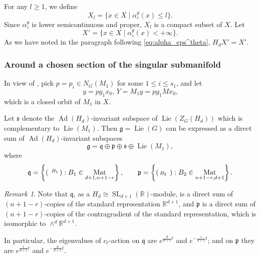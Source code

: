 \documentclass[12pt,reqno]{amsart}
\newcommand{\SL}{\operatorname{SL}}
\numberwithin{equation}{section}
\theoremstyle{plain}
\theoremstyle{definition}
\theoremstyle{remark}
\newtheorem{remark}{Remark}[section]
\newcommand\fg{\mathfrak{g}}
\newcommand\fq{\mathfrak{q}}
\newcommand\fs{\mathfrak{s}}
\newcommand{\R}{\mathbb{R}}
\newcommand{\eps}{\varepsilon}
\DeclareMathOperator{\Lie}{Lie}
\DeclareMathOperator{\Mat}{Mat}
\DeclareMathOperator{\Ad}{Ad}
\begin{document}
  For any $l\geq 1$, we define
    \begin{equation*}
        X_l = \{ x\in X \mid \alpha_\eps^\theta(x)\leq l \}.
    \end{equation*}
    Since $\alpha^\theta_\eps$ is lower semicontinuous and proper, $X_l$ is a compact subset of $X$. Let
    \begin{equation*}
        X'=\{ x\in X \mid \alpha_\eps^\theta(x)<+\infty \}.
    \end{equation*}
    As we have noted in the paragraph following \eqref{eq:alpha_eps^theta}, $H_dX'=X'$.  



    \subsubsection{Around a chosen section of the singular submanifold}  
In view of , pick $p=p_i\in N_G(M_1)$ for some $1\leq i\leq s_1$, and let 
\begin{equation} \label{eq:Y}
\text{$y=pg_1x_0$, $Y=M_1y=pg_1Mx_0$,}
\end{equation}
which is a closed orbit of $M_1$ in $X$.  

Let $\fs$ denote the $\Ad(H_d)$-invariant subspace of $\Lie(Z_G(H_d))$ which is complementary to $\Lie(M_1)$. Then $\fg=\Lie(G)$ can be expressed as a direct sum of $\Ad(H_d)$-invariant subspaces 
    \begin{equation} \label{eq:g=zmpq}
        \fg = \fq \oplus \mathfrak{p}\oplus \fs\oplus\Lie(M_1),
   \end{equation}
    where
    \begin{align}
        \mathfrak{q}=\left\{ 
        \begin{psmallmatrix}
            & B_1 \\
             &
        \end{psmallmatrix}: B_1\in\Mat_{d+1,n+1-r} \right\}, \qquad
        \mathfrak{p}=\left\{ 
        \begin{psmallmatrix}
            & \\
            B_2 &
        \end{psmallmatrix}: B_2\in\Mat_{n+1-r,d+1} \right\}.
        \label{eq:p}
    \end{align}
 
    \begin{remark} \label{rem:Hd on p+q}
        Note that $\mathfrak{q}$, as a $H_d\cong\SL_{d+1}(\R)$-module, is a direct sum of $(n+1-r)$-copies of the standard representation $\R^{d+1}$, and $\mathfrak{p}$ is a direct sum of $(n+1-r)$-copies of the contragradient of the standard representation, which is isomorphic to $\wedge^d \R^{d+1}$.

        In particular, the eigenvalues of $c_t$-action on $\mathfrak{q}$ are $e^{\frac{d}{d+1}t}$ and $ e^{-\frac{1}{d+1}t}$; and on $\mathfrak{p}$ they are $e^{\frac{1}{d+1}t}$ and $e^{-\frac{d}{d+1}t}$. 
    \end{remark}
\end{document}
